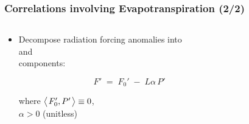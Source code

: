 \begin{frame}
\frametitle{Correlations {\normalsize involving Evapotranspiration\; (2/2)}}

\begin{columns}

\begin{column}{0.45\linewidth}

\vspace*{-2em}

\begin{itemize}

\item<1-> Decompose radiation forcing anomalies into \\ 
 and \\ 
 components:

\begin{equation}
  F' \;=\; F_0' \;-\; L\alpha\,  P'
\end{equation}

where $\big\langle\hskip1pt F_0',P'\hskip1pt\big\rangle\equiv0$, \\ 
$\alpha>0$ (unitless)



\end{itemize}

\end{column}

\hfill

\begin{column}{0.52\linewidth}

\vspace*{-0.5em}

\end{column}

\end{columns}


\end{frame}
